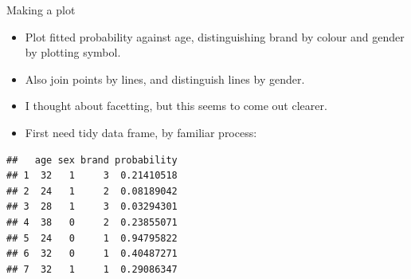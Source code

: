 \documentclass[ignorenonframetext,]{beamer}
\newenvironment{Shaded}{\begin{snugshade}}{\end{snugshade}}
\newcommand{\CommentTok}[1]{\textcolor[rgb]{0.56,0.35,0.01}{\textit{#1}}}
\newcommand{\DecValTok}[1]{\textcolor[rgb]{0.00,0.00,0.81}{#1}}
\newcommand{\KeywordTok}[1]{\textcolor[rgb]{0.13,0.29,0.53}{\textbf{#1}}}
\newcommand{\NormalTok}[1]{#1}
\newcommand{\OperatorTok}[1]{\textcolor[rgb]{0.81,0.36,0.00}{\textbf{#1}}}
\newcommand{\StringTok}[1]{\textcolor[rgb]{0.31,0.60,0.02}{#1}}
\begin{document}
\begin{frame}[fragile]{Making a plot}
\protect\hypertarget{making-a-plot}{}

\begin{itemize}
\item
  Plot fitted probability against age, distinguishing brand by colour
  and gender by plotting symbol.
\item
  Also join points by lines, and distinguish lines by gender.
\item
  I thought about facetting, but this seems to come out clearer.
\item
  First need tidy data frame, by familiar process:
\end{itemize}

\begin{Shaded}
\end{Shaded}

\begin{verbatim}
##   age sex brand probability
## 1  32   1     3  0.21410518
## 2  24   1     2  0.08189042
## 3  28   1     3  0.03294301
## 4  38   0     2  0.23855071
## 5  24   0     1  0.94795822
## 6  32   0     1  0.40487271
## 7  32   1     1  0.29086347
\end{verbatim}

\end{frame}
\end{document}

